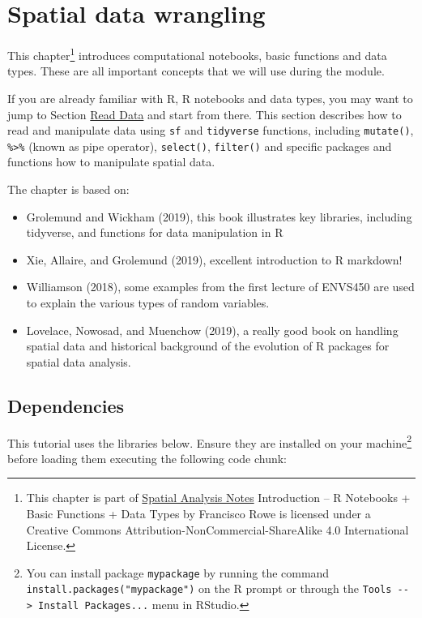 \documentclass[
  letterpaper,
  krantz2]{style/krantz}
\begin{document}
\hypertarget{spatial-data-wrangling}{%
\chapter{Spatial data wrangling}\label{spatial-data-wrangling}}

This chapter\footnote{This chapter is part of \href{index.html}{Spatial
  Analysis Notes} {Introduction -- R Notebooks + Basic Functions + Data
  Types} by Francisco Rowe is licensed under a Creative Commons
  Attribution-NonCommercial-ShareAlike 4.0 International License.}
introduces computational notebooks, basic functions and data types.
These are all important concepts that we will use during the module.

If you are already familiar with R, R notebooks and data types, you may
want to jump to Section \protect\hyperlink{sec_readdata}{Read Data} and
start from there. This section describes how to read and manipulate data
using \texttt{sf} and \texttt{tidyverse} functions, including
\texttt{mutate()}, \texttt{\%\textgreater{}\%} (known as pipe operator),
\texttt{select()}, \texttt{filter()} and specific packages and functions
how to manipulate spatial data.

The chapter is based on:

\begin{itemize}
\item
  Grolemund and Wickham (2019), this book illustrates key libraries,
  including tidyverse, and functions for data manipulation in R
\item
  Xie, Allaire, and Grolemund (2019), excellent introduction to R
  markdown!
\item
  Williamson (2018), some examples from the first lecture of ENVS450 are
  used to explain the various types of random variables.
\item
  Lovelace, Nowosad, and Muenchow (2019), a really good book on handling
  spatial data and historical background of the evolution of R packages
  for spatial data analysis.
\end{itemize}

\hypertarget{dependencies}{%
\section{Dependencies}\label{dependencies}}

This tutorial uses the libraries below. Ensure they are installed on
your machine\footnote{You can install package \texttt{mypackage} by
  running the command \texttt{install.packages("mypackage")} on the R
  prompt or through the
  \texttt{Tools\ -\/-\textgreater{}\ Install\ Packages...} menu in
  RStudio.} before loading them executing the following code chunk:
\end{document}
